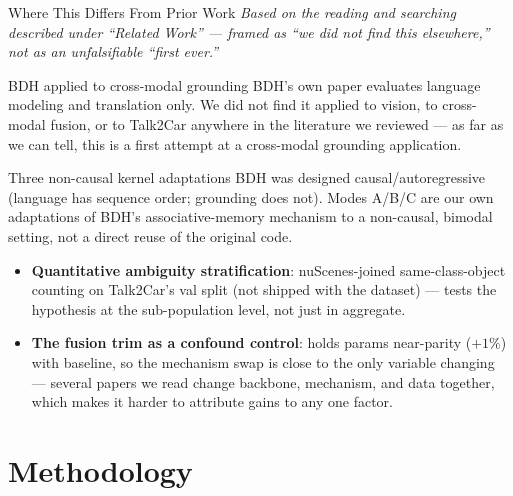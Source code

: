 \documentclass[aspectratio=169]{beamer}
\begin{document}
\begin{frame}{Where This Differs From Prior Work}
  \scriptsize\textit{Based on the reading and searching described under
  ``Related Work'' — framed as ``we did not find this elsewhere,'' not
  as an unfalsifiable ``first ever.''}
  \vspace{0.1cm}
  \begin{block}{BDH applied to cross-modal grounding}
    \scriptsize BDH's own paper evaluates language modeling and
    translation only. We did not find it applied to vision, to
    cross-modal fusion, or to Talk2Car anywhere in the literature we
    reviewed — as far as we can tell, this is a first attempt at a
    cross-modal grounding application.
  \end{block}
  \begin{block}{Three non-causal kernel adaptations}
    \scriptsize BDH was designed causal/autoregressive (language has
    sequence order; grounding does not). Modes A/B/C are our own
    adaptations of BDH's associative-memory mechanism to a non-causal,
    bimodal setting, not a direct reuse of the original code.
  \end{block}
  \footnotesize
  \begin{itemize}\setlength{\itemsep}{1pt}
    \item \textbf{Quantitative ambiguity stratification}: nuScenes-joined
      same-class-object counting on Talk2Car's val split (not shipped
      with the dataset) — tests the hypothesis at the sub-population
      level, not just in aggregate.
    \item \textbf{The fusion trim as a confound control}: holds params
      near-parity ($+1\%$) with baseline, so the mechanism swap is close
      to the only variable changing — several papers we read change
      backbone, mechanism, and data together, which makes it harder to
      attribute gains to any one factor.
  \end{itemize}
\end{frame}

\section{Methodology}
\end{document}
